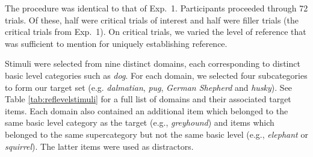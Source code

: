 \documentclass[11pt]{article}
\newcommand{\tableref}[1]{Table \ref{#1}}
\begin{document}
The procedure was identical to that of Exp.~1. Participants proceeded through 72 trials. Of these, half were critical trials of interest and half were filler trials (the critical trials from Exp.~1). On critical trials, we varied the level of reference that was sufficient to mention for uniquely establishing reference.

Stimuli were selected from nine distinct domains, each corresponding to distinct basic level categories such as \emph{dog}.  For each domain, we selected four subcategories to form our target set (e.g. \emph{dalmatian}, \emph{pug}, \emph{German Shepherd} and \emph{husky}). See \tableref{tab:reflevelstimuli} for a full list of domains and their associated target items. Each domain also contained an additional item which belonged to the same basic level category as the target (e.g., \emph{greyhound}) and items which belonged to the same supercategory but not the same basic level (e.g., \emph{elephant} or \emph{squirrel}). The latter items were used as distractors.
\end{document}
